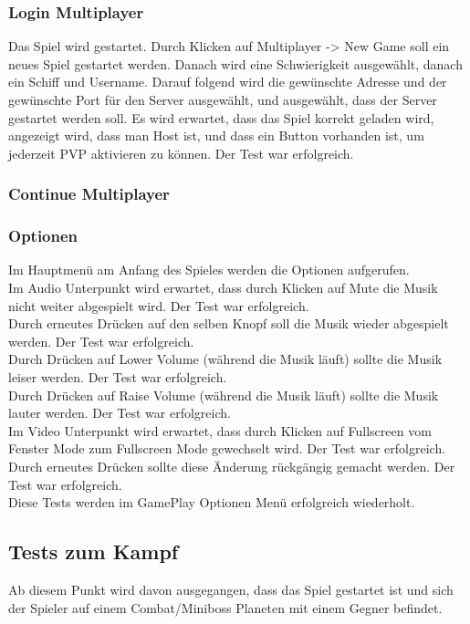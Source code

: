 \documentclass[fontsize=12pt,paper=a4,twoside]{scrartcl}
\begin{document}
\subsubsection{Login Multiplayer}
Das Spiel wird gestartet. Durch Klicken auf Multiplayer -> New Game soll ein neues Spiel gestartet werden. Danach wird eine Schwierigkeit ausgewählt, danach ein Schiff und Username. Darauf folgend wird die gewünschte Adresse und der gewünschte Port für den Server ausgewählt, und ausgewählt, dass der Server gestartet werden soll. Es wird erwartet, dass das Spiel korrekt geladen wird, angezeigt wird, dass man Host ist, und dass ein Button vorhanden ist, um jederzeit PVP aktivieren zu können. Der Test war erfolgreich. \\
\subsubsection{Continue Multiplayer}

\subsubsection{Optionen}
Im Hauptmenü am Anfang des Spieles werden die Optionen aufgerufen. \\
Im Audio Unterpunkt wird erwartet, dass durch Klicken auf Mute die Musik nicht weiter abgespielt wird. Der Test war erfolgreich. \\
Durch erneutes Drücken auf den selben Knopf soll die Musik wieder abgespielt werden. Der Test war erfolgreich. \\
Durch Drücken auf Lower Volume (während die Musik läuft) sollte die Musik leiser werden. Der Test war erfolgreich. \\
Durch Drücken auf Raise Volume (während die Musik läuft) sollte die Musik lauter werden. Der Test war erfolgreich. \\
Im Video Unterpunkt wird erwartet, dass durch Klicken auf Fullscreen vom Fenster Mode zum Fullscreen Mode gewechselt wird.  Der Test war erfolgreich. \\
Durch erneutes Drücken sollte diese Änderung rückgängig gemacht werden.  Der Test war erfolgreich. \\
Diese Tests werden im GamePlay Optionen Menü erfolgreich wiederholt. \\
\subsection{Tests zum Kampf}
Ab diesem Punkt wird davon ausgegangen, dass das Spiel gestartet ist und sich der Spieler auf einem Combat/Miniboss Planeten mit einem Gegner befindet. \\
\end{document}
